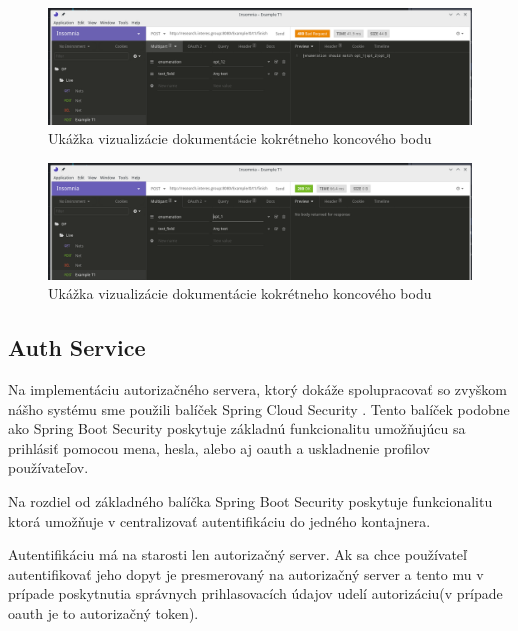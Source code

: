 \begin{figure}[!htbp] 
	\centering 
	\includegraphics[width=16cm]{img/insomnia_400.png} 
	\caption{Ukážka vizualizácie dokumentácie kokrétneho koncového bodu} 
	\label{insomnia_400} 
\end{figure}

\begin{figure}[!htbp] 
	\centering 
	\includegraphics[width=16cm]{img/insomnia_200.png} 
	\caption{Ukážka vizualizácie dokumentácie kokrétneho koncového bodu} 
	\label{insomnia_200} 
\end{figure}








\subsection{Auth Service}  \label{section_auth}

Na implementáciu autorizačného servera, ktorý dokáže spolupracovať so zvyškom nášho systému sme použili balíček Spring Cloud Security \cite{cloud_security}. Tento balíček podobne ako Spring Boot Security poskytuje základnú funkcionalitu umožňujúcu sa prihlásiť pomocou mena, hesla, alebo aj \acrshort{oauth} a uskladnenie profilov používateľov.  

Na rozdiel od základného balíčka Spring Boot Security poskytuje funkcionalitu ktorá umožňuje v centralizovať autentifikáciu do jedného kontajnera.  

Autentifikáciu má na starosti len autorizačný server. Ak sa chce používateľ autentifikovať jeho dopyt je presmerovaný na autorizačný server a tento mu v prípade poskytnutia správnych prihlasovacích údajov udelí autorizáciu(v prípade \acrshort{oauth} je to autorizačný token).   

